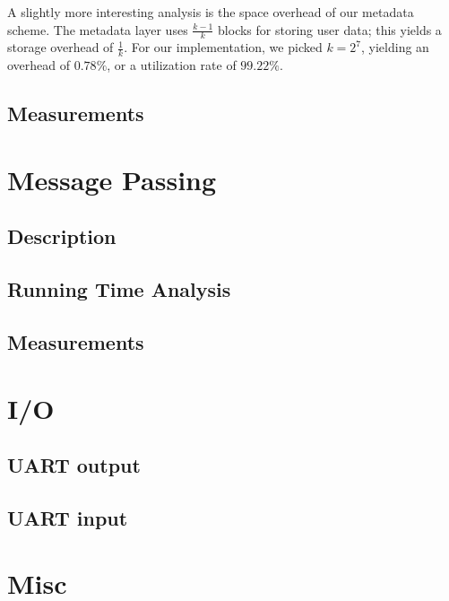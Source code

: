 \documentclass[12pt]{report}
\begin{document}
    A slightly more interesting analysis is the space overhead of our metadata
    scheme. The metadata layer uses $\frac{k-1}{k}$ blocks for storing user
    data; this yields a storage overhead of $\frac{1}{k}$. For our
    implementation, we picked $k=2^7$, yielding an overhead of $0.78\%$, or a
    utilization rate of $99.22\%$.

\section{Measurements}

\chapter{Message Passing}

\section{Description}

\section{Running Time Analysis}

\section{Measurements}

\chapter{I/O}

\section{UART output}

\section{UART input}

\chapter{Misc}
\end{document}
